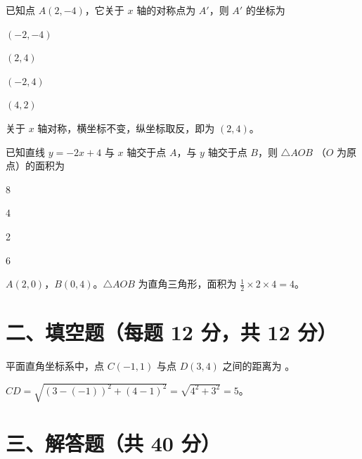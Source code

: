 \documentclass{exam-zh}
\begin{document}
\begin{question}[points=12]
  已知点 $A(2, -4)$，它关于 $x$ 轴的对称点为 $A'$，则 $A'$ 的坐标为
  \begin{choices}
    \item $(-2, -4)$
    \item $(2, 4)$
    \item $(-2, 4)$
    \item $(4, 2)$
  \end{choices}
  \paren[B]
  \begin{solutionblock}
    关于 $x$ 轴对称，横坐标不变，纵坐标取反，即为 $(2, 4)$。
  \end{solutionblock}
\end{question}



\begin{question}[points=12]
  已知直线 $y = -2x + 4$ 与 $x$ 轴交于点 $A$，与 $y$ 轴交于点 $B$，则 $\triangle AOB$ （$O$ 为原点）的面积为
  \begin{choices}
    \item 8
    \item 4
    \item 2
    \item 6
  \end{choices}
  \paren[B]
  \begin{solutionblock}
    $A(2, 0)$，$B(0, 4)$。$\triangle AOB$ 为直角三角形，面积为 $\frac{1}{2} \times 2 \times 4 = 4$。
  \end{solutionblock}
\end{question}


\section*{二、填空题（每题 12 分，共 12 分）}


\begin{question}[points=12]
  平面直角坐标系中，点 $C(-1, 1)$ 与点 $D(3, 4)$ 之间的距离为 \fillin。
  \paren[5]
  \begin{solutionblock}
    $CD = \sqrt{(3 - (-1))^2 + (4 - 1)^2} = \sqrt{4^2 + 3^2} = 5$。
  \end{solutionblock}
\end{question}


\section*{三、解答题（共 40 分）}

\end{document}
